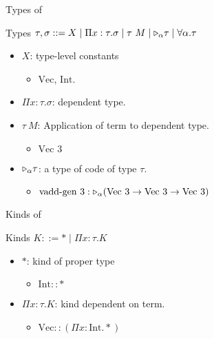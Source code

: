 \documentclass[dvipdfmx,aspectratio=169, 20pt]{beamer}
\begin{document}
\begin{frame}[fragile]{Types of \LMD}
    \begin{block}{Types}
    \( \tau,\sigma ::= X \mid \Pi x:\tau.\sigma \mid \tau\ M \mid {\mathop{\triangleright}}_{\alpha} \tau \mid \forall\alpha.\tau \)
    \end{block}
    \begin{itemize}
        \item \( X \): type-level constants 
            \begin{itemize}
                \item \( \text{Vec} \), \( \text{Int} \).
            \end{itemize}
        \item \( \Pi x:\tau.\sigma \): dependent type.
        \item \( \tau\ M \): Application of term to dependent type.
            \begin{itemize}
                \item \( \text{Vec } 3 \)
            \end{itemize}
        \item \( {\mathop{\triangleright}}_{\alpha} \tau \): a type of code of type \( \tau \).
            \begin{itemize}
                \item \( \text{vadd-gen 3} : {\mathop{\triangleright}}_\alpha (\text{Vec}\ 3 \to \text{Vec}\ 3 \to \text{Vec}\ 3) \)
            \end{itemize}
    \end{itemize}
    \note{
    }
\end{frame}

\begin{frame}[fragile]{Kinds of \LMD}
    \begin{block}{Kinds}
        \( K ::= * \mid \Pi x:\tau.K \)
    \end{block}
    \begin{itemize}
        \item \( * \): kind of proper type
            \begin{itemize}
                \item \( \text{Int} :: * \)
            \end{itemize}
        \item \( \Pi x:\tau.K \): kind dependent on term.
            \begin{itemize}
                \item \( \text{Vec} :: (\Pi x:\text{Int}.*) \)
            \end{itemize}
    \end{itemize}
    \note{
    }
\end{frame}
\end{document}
